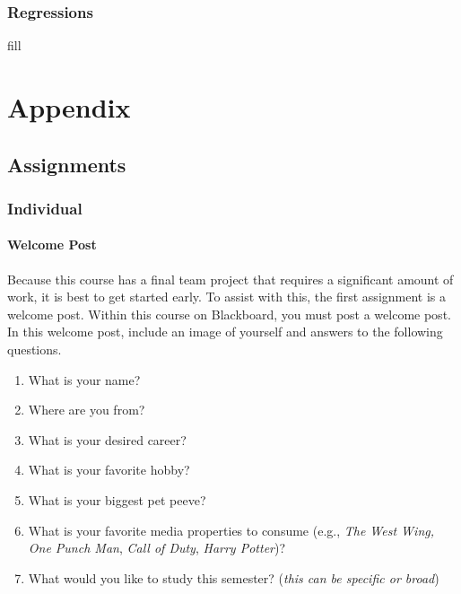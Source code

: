 \documentclass[
  b5paper]{book}
\providecommand{\tightlist}{%
  \setlength{\itemsep}{0pt}\setlength{\parskip}{0pt}}
\begin{document}
\hypertarget{regressions}{%
\subsection*{Regressions}\label{regressions}}

fill

\hypertarget{appendix}{%
\chapter{Appendix}\label{appendix}}

\hypertarget{assignments}{%
\section{Assignments}\label{assignments}}

\hypertarget{individual}{%
\subsection*{Individual}\label{individual}}

\hypertarget{welcome-post}{%
\subsubsection*{Welcome Post}\label{welcome-post}}

Because this course has a final team project that requires a significant amount of work, it is best to get started early. To assist with this, the first assignment is a welcome post. Within this course on Blackboard, you must post a welcome post. In this welcome post, include an image of yourself and answers to the following questions.

\begin{enumerate}
\def\labelenumi{\arabic{enumi}.}
\tightlist
\item
  What is your name?
\item
  Where are you from?
\item
  What is your desired career?
\item
  What is your favorite hobby?
\item
  What is your biggest pet peeve?
\item
  What is your favorite media properties to consume (e.g., \emph{The West Wing,} \emph{One Punch Man}, \emph{Call of Duty}, \emph{Harry Potter})?
\item
  What would you like to study this semester? (\emph{this can be specific or broad})
\end{enumerate}
\end{document}
